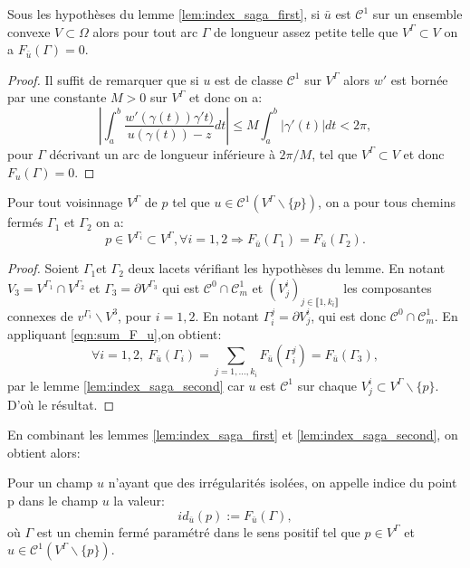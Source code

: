 \begin{lemma}
    \label{lem:index_saga_second}
    Sous les hypothèses du lemme \ref{lem:index_saga_first}, si $\bar{u}$ est $\mathcal{C}^1$ sur un ensemble convexe $V\subset\Omega$ alors pour tout arc $\Gamma$ de longueur assez petite telle que $V^\Gamma\subset V$ on a $F_{\bar{u}}(\Gamma)=0$.
\end{lemma}

\begin{proof}
    Il suffit de remarquer que si $u$ est de classe $\mathcal{C}^1$ sur $V^\Gamma$ alors $w'$ est bornée par une constante $M>0$ sur $V^\Gamma$ et donc on a:
    $$
    \left|\int_a^b\frac{w'(\gamma(t))\gamma't)}{u(\gamma(t))-z}dt\right|\leq M\int_a^b|\gamma'(t)|dt<2\pi,
    $$
    pour $\Gamma$ décrivant un arc de longueur inférieure à $2\pi/M$, tel que $V^\Gamma\subset V$ et donc $F_u(\Gamma)=0$.
\end{proof}

\begin{lemma}
    \label{lem:index_saga_third}
    Pour tout voisinnage $V^\Gamma$ de $p$ tel que $u\in\mathcal{C}^1(V^\Gamma\backslash\{p\})$, on a pour tous chemins fermés $\Gamma_1$ et $\Gamma_2$ on a:
    $$
    p\in V^{\Gamma_i}\subset V^\Gamma, \forall i=1, 2\Longrightarrow F_{\bar{u}}(\Gamma_1)=F_{\bar{u}}(\Gamma_2).
    $$
\end{lemma}

\begin{proof}
    Soient $\Gamma_1$et $\Gamma_2$ deux lacets vérifiant les hypothèses du lemme. En notant $V_3=V^{\Gamma_1}\cap V^{\Gamma_2}$ et $\Gamma_3=\partial V^{\Gamma_3}$ qui est $\mathcal{C}^0\cap\mathcal{C}^1_m$ et $(V^i_j)_{j\in\llbracket 1, k_i\rrbracket}$ les composantes connexes de $v^{\Gamma_i}\backslash V^3$, pour $i=1,2$. En notant $\Gamma_i^j=\partial V^i_j$, qui est donc $\mathcal{C}^0\cap\mathcal{C}^1_m$. En appliquant \eqref{eqn:sum_F_u},on obtient:
    $$
    \forall i=1,2,~F_{\bar{u}}(\Gamma_i)=\sum_{j=1,\dots,k_i}F_{\bar{u}}(\Gamma_i^j)=F_{\bar{u}}(\Gamma_3),
    $$
    par le lemme \ref{lem:index_saga_second} car $u$ est $\mathcal{C}^1$ sur chaque $V^i_j\subset V^\Gamma\backslash\{p\}$. D'où le résultat.
\end{proof}

En combinant les lemmes \ref{lem:index_saga_first} et \ref{lem:index_saga_second}, on obtient alors:

\begin{definition}
    Pour un champ $u$ n'ayant que des irrégularités isolées, on appelle indice du point p dans le champ $u$ la valeur:
    $$
    id_{\bar{u}}(p):=F_{\bar{u}}(\Gamma),
    $$
    où $\Gamma$ est un chemin fermé paramétré dans le sens positif tel que $p\in V^\Gamma$ et $u\in\mathcal{C}^1(V^\Gamma\backslash\{p\})$.
    \label{def:index}
\end{definition}

